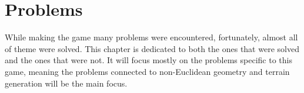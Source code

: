 \chapter{Problems} \label{ch:problems}
While making the game many problems were encountered, fortunately, almost all of theme were solved.
This chapter is dedicated to both the ones that were solved and the ones that were not.
It will focus mostly on the problems specific to this game, meaning the problems connected to non-Euclidean geometry and terrain generation will be the main focus.




